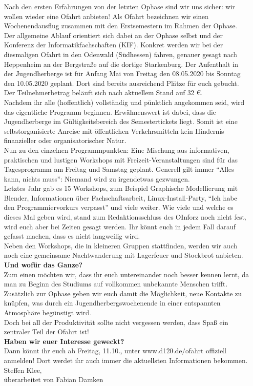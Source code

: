 {Nach den ersten Erfahrungen von der letzten Ophase sind wir uns sicher: wir wollen wieder eine Ofahrt anbieten!}
{
    Als Ofahrt bezeichnen wir einen Wochenendausflug zusammen mit den Erstsemestern im Rahmen der Ophase. Der allgemeine Ablauf orientiert sich dabei
    an der Ophase selbst und der Konferenz der Informatikfachschaften (KIF).
    Konkret werden wir bei der diesmaligen Ofahrt in den Odenwald (Südhessen) fahren, genauer gesagt nach Heppenheim an der Bergstraße auf die dortige Starkenburg. Der Aufenthalt in der Jugendherberge ist für Anfang Mai von Freitag den 08.05.2020 bis Sonntag den 10.05.2020 geplant.
    Dort sind bereits ausreichend Plätze für euch gebucht. Der Teilnehmerbetrag beläuft sich nach aktuellem Stand auf 32 \euro.\\

    Nachdem ihr alle (hoffentlich) vollständig und pünktlich angekommen seid, wird das eigentliche Programm beginnen. Erwähnenswert ist dabei, dass die Jugendherberge im Gültigkeitsbereich des Semestertickets liegt. Somit ist eine selbstorganisierte Anreise mit öffentlichen Verkehrsmitteln kein Hindernis finanzieller oder organisatorischer Natur.\\

    Nun zu den einzelnen Programmpunkten:
    Eine Mischung aus informativen, praktischen und lustigen Workshops mit Freizeit-Veranstaltungen sind für das Tagesprogramm am Freitag und Samstag geplant.
    Generell gilt immer "`Alles kann, nichts muss"': Niemand wird zu irgendetwas gezwungen.\\

    Letztes Jahr gab es 15 Workshops, zum Beispiel Graphische Modellierung mit Blender, Informationen über Fachschaftsarbeit, Linux-Install-Party, "`Ich habe den Programmiervorkurs verpasst"' und viele weiter. Wie viele und welche es dieses Mal geben wird, stand zum Redaktionsschluss des OInforz noch nicht fest, wird euch aber bei Zeiten gesagt werden. Ihr könnt euch in jedem Fall darauf gefasst machen, dass es nicht langweilig wird.\\

    Neben den Workshops, die in kleineren Gruppen stattfinden, werden wir auch noch eine gemeinsame Nachtwanderung mit Lagerfeuer und Stockbrot anbieten.\\

    \textbf{Und wofür das Ganze?}\\
    Zum einen möchten wir, dass ihr euch untereinander noch besser kennen lernt, da man zu Beginn des Studiums auf vollkommen unbekannte Menschen trifft. Zusätzlich zur Ophase geben wir euch damit die Möglichkeit, neue Kontakte zu knüpfen, was durch ein Jugendherbergswochenende in einer entspannten Atmosphäre begünstigt wird.\\

    Doch bei all der Produktivität sollte nicht vergessen werden, dass Spaß ein zentraler Teil der Ofahrt ist!\\

    \textbf{Haben wir euer Interesse geweckt?}\\
    Dann könnt ihr euch ab Freitag, 11.10., unter www.d120.de/ofahrt offiziell anmelden! Dort werdet ihr auch immer die aktuellsten Informationen bekommen.
}
{Steffen Klee, \\ überarbeitet von Fabian Damken}
\newpage
